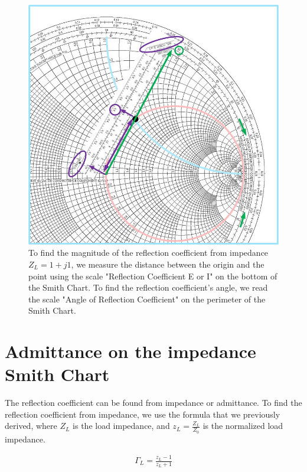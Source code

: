 \documentclass{ximera}
\begin{document}
\begin{figure}[htbp]
\begin{center}
\includegraphics[scale=0.3]{../jpg/FindingGammaFromImpedanceonSC.jpg}
\end{center}
\caption{To find the magnitude of the reflection coefficient from impedance $Z_L=1+j 1$, we measure the distance between the origin and the point using the scale "Reflection Coefficient E or I" on the bottom of the Smith Chart. To find the reflection coefficient's angle, we read the scale "Angle of Reflection Coefficient" on the perimeter of the Smith Chart.}
\label{fig:SCDerscgammafromZ}
\end{figure}


\newpage

\section{Admittance on the impedance Smith Chart} 

The reflection coefficient can be found from impedance or admittance. To find the reflection coefficient from impedance, we use the formula that we previously derived, where $Z_L$ is the load impedance, and $z_L=\frac{Z_L}{Z_0}$ is the normalized load impedance.

\begin{eqnarray}
\Gamma_L=\frac{z_L-1}{z_L+1} \label{eq:GammaImp} 
\end{eqnarray}
\end{document}
